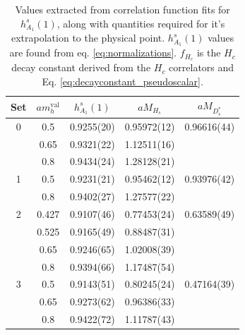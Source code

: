\begin{table}
  \begin{center}
    \begin{tabular}{ c c c c c }
      \hline
      Set & $am_h^{\text{val}}$ & $h^s_{A_1}(1)$& $aM_{H_s}$& $aM_{D^*_s}$ \\ [0.5ex]
      \hline
      0 & 0.5 & 0.9255(20) & 0.95972(12) & 0.96616(44)\\ [0.5ex]
      & 0.65 & 0.9321(22) & 1.12511(16) & \\ [0.5ex]
      & 0.8 & 0.9434(24) & 1.28128(21) & \\ [0.5ex]
      \hline
      1 & 0.5 & 0.9231(21) & 0.95462(12) & 0.93976(42)\\ [0.5ex]
      & 0.8 & 0.9402(27) & 1.27577(22) & \\ [0.5ex]
      \hline
      2 & 0.427 & 0.9107(46) & 0.77453(24) & 0.63589(49)\\ [0.5ex]
      & 0.525 & 0.9165(49) & 0.88487(31) & \\ [0.5ex]
      & 0.65 & 0.9246(65) & 1.02008(39) & \\ [0.5ex]
      & 0.8 & 0.9394(66) & 1.17487(54) & \\ [0.5ex]
      \hline
      3 & 0.5 & 0.9143(51) & 0.80245(24) & 0.47164(39)\\ [0.5ex]
      & 0.65 & 0.9273(62) & 0.96386(33) & \\ [0.5ex]
      & 0.8 & 0.9422(72) & 1.11787(43) & \\ [0.5ex]
      \hline
    \end{tabular}
    \caption{Values extracted from correlation function fits for $h^s_{A_1}(1)$, along with quantities required for it's extrapolation to the physical point. $h^s_{A_1}(1)$ values are found from eq. \eqref{eq:normalizations}. $f_{H_c}$  is the $H_c$ decay constant derived from the $H_c$ correlators and Eq. \eqref{eq:decayconstant_pseudoscalar}.  \label{tab:results} }
  \end{center}
\end{table}

